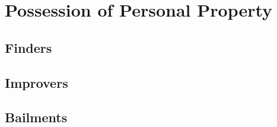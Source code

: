 \chapter{Possession of Personal Property}



\section{Finders}





\begin{questions}

\end{questions}





\begin{questions}

\end{questions}


\section{Improvers}





\begin{questions}

\end{questions}


\section{Bailments}





%

\begin{questions}


\end{questions}


